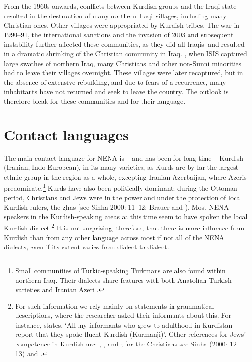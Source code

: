 \documentclass[output=paper]{langsci/langscibook}
\begin{document}
From the 1960s onwards, conflicts between Kurdish groups and the Iraqi state resulted in the destruction of many northern Iraqi villages, including many Christian ones. Other villages were appropriated by Kurdish tribes. The war in 1990–91, the international sanctions and the invasion of 2003 and subsequent instability further affected these communities, as they did all Iraqis, and resulted in a dramatic shrinking of the Christian community in Iraq. \citealt{In2014}, when ISIS captured large swathes of northern Iraq, many Christians and other non-Sunni minorities had to leave their villages overnight. These villages were later recaptured, but in the absence of extensive rebuilding, and due to fears of a recurrence, many inhabitants have not returned and seek to leave the country. The outlook is therefore bleak for these communities and for their language.

\section{\label{bkm:Ref534214034}Contact languages}

The main contact language for NENA is – and has been for long time – Kurdish (Iranian, Indo-European), in its many varieties, as Kurds are by far the largest ethnic group in the region as a whole, excepting Iranian Azerbaijan, where Azeris predominate.\footnote{Small communities of Turkic-speaking Turkmans are also found within northern Iraq. Their dialects share features with both Anatolian Turkish varieties and Iranian Azeri \citep{Bulut2007}.} Kurds have also been politically dominant: during the Ottoman period, Christians and Jews were in the power and under the protection of local Kurdish rulers, the ghas (see Sinha 2000: 11–12; Brauer and \citet[223]{Patai1993}). Most NENA-speakers in the Kurdish-speaking areas at this time seem to have spoken the local Kurdish dialect.\footnote{For such information we rely mainly on statements in grammatical descriptions, where the researcher asked their informants about this. For instance, \citet[9]{Hoberman1989} states, ‘All my informants who grew to adulthood in Kurdistan report that they spoke fluent Kurdish (Kurmanji)’. Other references for Jews’ competence in Kurdish are: \citet[216]{Sabar1978}, \citet[5]{Mutzafi2004}, \citet[198]{Khan2007} and \citet[11]{Khan2009}; for the Christians see Sinha (2000: 12–13) and \citet[18]{Khan2008}.} It is not surprising, therefore, that there is more influence from Kurdish than from any other language across most if not all of the NENA dialects, even if its extent varies from dialect to dialect.
\end{document}
